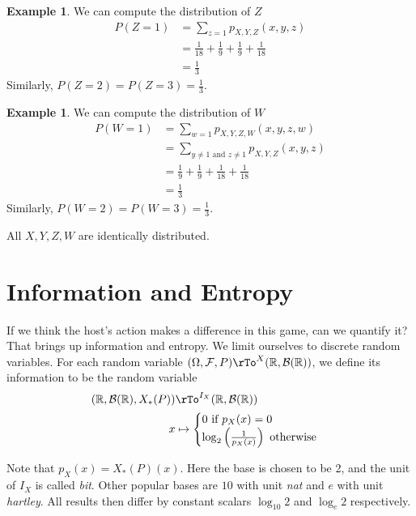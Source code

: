\documentclass[11pt]{amsart}
\theoremstyle{definition}
\newtheorem{example}[theorem]{Example}
\begin{document}
\begin{example} We can compute the distribution of $Z$
\begin{align*}
P(Z = 1) & = \sum\limits_{z = 1} p_{X,Y,Z}(x, y, z) \\
 & = \frac{1}{18} + \frac{1}{9} + \frac{1}{9} + \frac{1}{18} \\
 & = \frac{1}{3}
\end{align*}
Similarly, $P(Z = 2) = P(Z = 3) = \frac{1}{3}$.
\end{example}

\begin{example} We can compute the distribution of $W$
\begin{align*}
P(W = 1) & = \sum\limits_{w = 1} p_{X, Y, Z, W}(x, y, z, w) \\
 & = \sum\limits_{y \neq 1 \text{ and } z \neq 1} p_{X,Y,Z}(x, y, z) \\
 & = \frac{1}{9} + \frac{1}{9} + \frac{1}{18} + \frac{1}{18} \\
 & = \frac{1}{3}
\end{align*}
Similarly, $P(W = 2) = P(W = 3) = \frac{1}{3}$.
\end{example}

All $X, Y, Z, W$ are identically distributed.

\section{Information and Entropy} If we think the host's action makes a difference in this game, can we quantify it? That brings up information and entropy. We limit ourselves to discrete random variables.
\dfn For each random variable $(\Omega, \mathcal{F}, P) \rTo^X (\mathbb{R}, \mathcal{B}(\mathbb{R}))$, we define its information to be the random variable
\begin{align*}
(\mathbb{R}, \mathcal{B}(\mathbb{R}), X_*(P)) & \rTo^{I_X} (\mathbb{R}, \mathcal{B}(\mathbb{R})) \\
x & \mapsto \begin{cases} 0 \text{ if } p_X(x) = 0 \\ \log_2 \left( \frac{1}{p_X(x)} \right) \text{ otherwise} \end{cases}
\end{align*}

Note that $p_X(x) = X_*(P)(x)$. Here the base is chosen to be 2, and the unit of $I_X$ is called {\it bit}. Other popular bases are $10$ with unit {\it nat} and $e$ with unit {\it hartley}. All results then differ by constant scalars $\log_{10} 2$ and $\log_e 2$ respectively.
\end{document}
